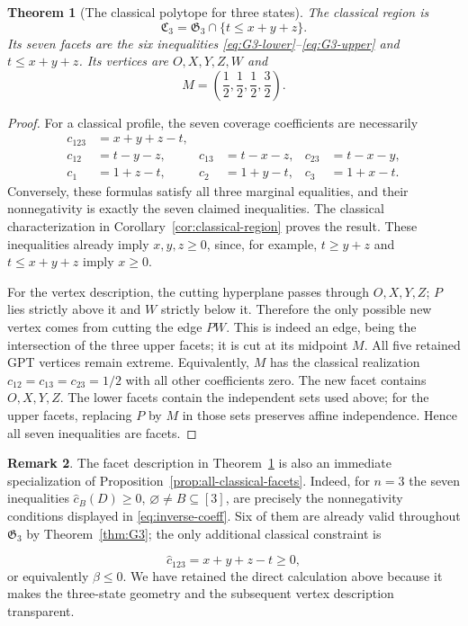 \documentclass[a4paper,11pt,onecolumn,unpublished]{quantumarticle}
\newtheorem{theorem}{Theorem}[section]
\theoremstyle{definition}
\newtheorem{remark}[theorem]{Remark}
\newcommand{\1}{\mathbf 1}
\newcommand{\Creg}{\mathfrak C}
\newcommand{\Greg}{\mathfrak G}
\begin{document}
\begin{theorem}[The classical polytope for three states]\label{thm:C3}
The classical region is
\begin{equation}\label{eq:C3-cut}
 \Creg_3=\Greg_3\cap\{t\le x+y+z\}.
\end{equation}
Its seven facets are the six inequalities
\eqref{eq:G3-lower}--\eqref{eq:G3-upper} and $t\le x+y+z$.
Its vertices are $O,X,Y,Z,W$ and
\begin{equation}\label{eq:M-vertex}
 M=\left(\frac12,\frac12,\frac12,\frac32\right).
\end{equation}
\end{theorem}
\begin{proof}
For a classical profile, the seven coverage coefficients are necessarily
\begin{align}
 c_{123}&=x+y+z-t,\nonumber\\
 c_{12}&=t-y-z,&c_{13}&=t-x-z,&c_{23}&=t-x-y,\label{eq:inverse-coeff}\\
 c_1&=1+z-t,&c_2&=1+y-t,&c_3&=1+x-t.\nonumber
\end{align}
Conversely, these formulas satisfy all three marginal equalities, and their
nonnegativity is exactly the seven claimed inequalities. The classical
characterization in Corollary~\ref{cor:classical-region} proves the result.
These inequalities already imply $x,y,z\ge0$, since, for example,
$t\ge y+z$ and $t\le x+y+z$ imply $x\ge0$.

For the vertex description, the cutting hyperplane passes through $O,X,Y,Z$;
$P$ lies strictly above it and $W$ strictly below it. Therefore the only possible
new vertex comes from cutting the edge $PW$. This is indeed an edge, being the
intersection of the three upper facets; it is cut at its midpoint $M$.
All five retained GPT vertices remain extreme. Equivalently, $M$ has the
classical realization $c_{12}=c_{13}=c_{23}=1/2$ with all other coefficients
zero. The new facet contains $O,X,Y,Z$. The lower facets contain the independent
sets used above; for the upper facets, replacing $P$ by $M$ in those sets
preserves affine independence. Hence all seven inequalities are facets.
\end{proof}

\begin{remark}
	The facet description in Theorem~\ref{thm:C3} is also an immediate specialization of Proposition~\ref{prop:all-classical-facets}. Indeed, for $n=3$ the seven inequalities $\widehat c_B(D)\ge0$, $\varnothing\ne B\subseteq[3]$, are precisely the nonnegativity conditions displayed in \eqref{eq:inverse-coeff}. Six of them are already valid throughout $\Greg_3$ by Theorem~\ref{thm:G3}; the only additional classical constraint is
	
	$$
	\widehat c_{123}=x+y+z-t\ge0,
	$$
	or equivalently $\beta\le0$. We have retained the direct calculation above because it makes the three-state geometry and the subsequent vertex description transparent.
\end{remark}
\end{document}
